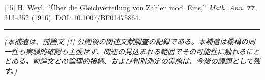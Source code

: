 \documentclass[
]{ltjsarticle}
\begin{document}
{[}15{]} H. Weyl, ``Über die Gleichverteilung von Zahlen mod. Eins,''
\emph{Math. Ann.} \textbf{77}, 313--352 (1916). DOI: 10.1007/BF01475864.

\begin{center}\rule{0.5\linewidth}{0.5pt}\end{center}

\emph{(本補遺は、前論文 {[}1{]}
公開後の関連文献調査の記録である。本補遺は機構の同一性も実験的確認も主張せず、関連の見込まれる範囲でその可能性に触れるにとどめる。前論文との論理的接続、および判別測定の実施は、今後の課題として残す。)}
\end{document}
